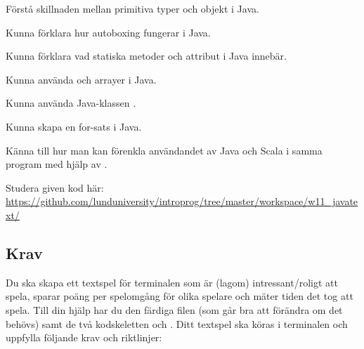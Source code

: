
\Lab{\LabWeekELEVEN}

\begin{Goals}
\item Förstå skillnaden mellan primitiva typer och objekt i Java.
\item Kunna förklara hur autoboxing fungerar i Java.
\item Kunna förklara vad statiska metoder och attribut i Java innebär.
\item Kunna använda  och arrayer i Java.
\item Kunna använda Java-klassen .
\item Kunna skapa en for-sats i Java.
\item Känna till hur man kan förenkla användandet av Java och Scala i samma program med hjälp av .
\end{Goals}

\begin{Preparations}
\item {}
\item Studera given kod här: \url{https://github.com/lunduniversity/introprog/tree/master/workspace/w11_javatext/}
\end{Preparations}

\subsection{Krav}

Du ska skapa ett textspel för terminalen som är (lagom) intressant/roligt att spela, sparar poäng per spelomgång för olika spelare och mäter tiden det tog att spela. Till din hjälp har du den färdiga filen  (som går bra att förändra om det behövs) samt de två kodskeletten  och . Ditt textspel ska köras i terminalen och uppfylla följande krav och riktlinjer:

